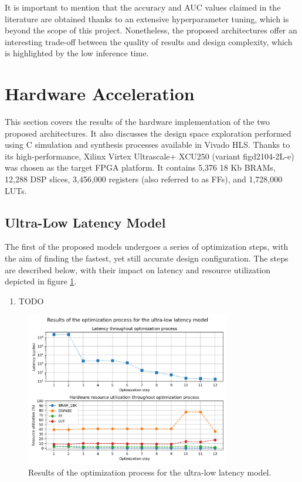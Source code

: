 It is important to mention that the accuracy and AUC values claimed in the literature are obtained thanks to an extensive hyperparameter tuning, which is beyond the scope of this project. Nonetheless, the proposed architectures offer an interesting trade-off between the quality of results and design complexity, which is highlighted by the low inference time.


\section{Hardware Acceleration}
This section covers the results of the hardware implementation of the two proposed architectures. It also discusses the design space exploration performed using C simulation and synthesis processes available in Vivado HLS. Thanks to its high-performance, Xilinx Virtex Ultrascale+ XCU250 (variant figd2104-2L-e) was chosen as the target FPGA platform. It contains 5,376 18 Kb BRAMs, 12,288 DSP slices, 3,456,000 registers (also referred to as FFs), and 1,728,000 LUTs.

\subsection{Ultra-Low Latency Model}
The first of the proposed models undergoes a series of optimization steps, with the aim of finding the fastest, yet still accurate design configuration. The steps are described below, with their impact on latency and resource utilization depicted in figure \ref{fig:hardware-optimizations}.

\begin{enumerate}
  \item TODO
\end{enumerate}

\begin{figure}[hpt!]
  \centering
  \includegraphics[trim={0cm 0cm 0cm 1cm}, clip, width=0.8\textwidth, center]{../logs/hardware_optimizations.png}
  \caption{Results of the optimization process for the ultra-low latency model.}
  \label{fig:hardware-optimizations}
\end{figure}

